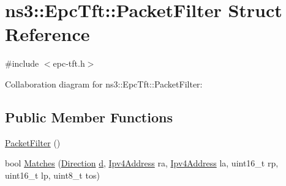 \hypertarget{structns3_1_1EpcTft_1_1PacketFilter}{}\section{ns3\+:\+:Epc\+Tft\+:\+:Packet\+Filter Struct Reference}
\label{structns3_1_1EpcTft_1_1PacketFilter}


{\ttfamily \#include $<$epc-\/tft.\+h$>$}



Collaboration diagram for ns3\+:\+:Epc\+Tft\+:\+:Packet\+Filter\+:
\subsection*{Public Member Functions}
\begin{DoxyCompactItemize}
\item 
\hyperlink{structns3_1_1EpcTft_1_1PacketFilter_a89a56c133a57600c2de2e5962c0cc893}{Packet\+Filter} ()
\item 
bool \hyperlink{structns3_1_1EpcTft_1_1PacketFilter_a34565649cf05d220473e8eebb41c3dce}{Matches} (\hyperlink{classns3_1_1EpcTft_a6037510585658e017a8011862ce56946}{Direction} \hyperlink{lte__pathloss_8m_a1aabac6d068eef6a7bad3fdf50a05cc8}{d}, \hyperlink{classns3_1_1Ipv4Address}{Ipv4\+Address} ra, \hyperlink{classns3_1_1Ipv4Address}{Ipv4\+Address} la, uint16\+\_\+t rp, uint16\+\_\+t lp, uint8\+\_\+t tos)
\end{DoxyCompactItemize}
